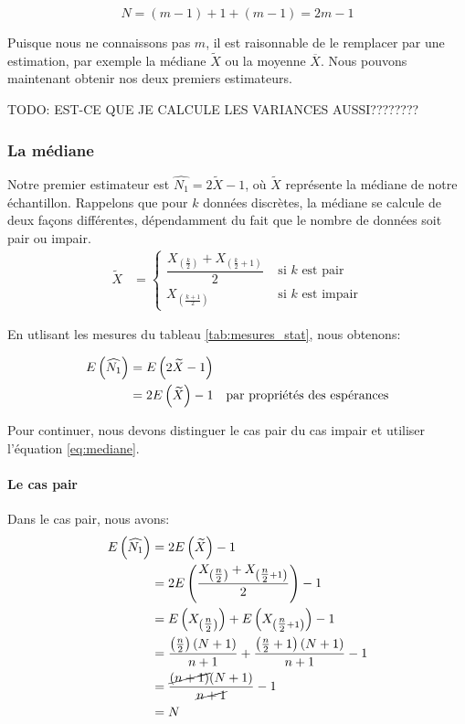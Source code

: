 \documentclass[10pt]{article}
\begin{document}
\[N=(m-1)+1+(m-1)=2m-1\]

Puisque nous ne connaissons pas \(m\), il est raisonnable de le
remplacer par une estimation, par exemple la médiane \(\widetilde{X}\)
ou la moyenne \(\overline{X}\). Nous pouvons maintenant obtenir nos deux
premiers estimateurs.

TODO: EST-CE QUE JE CALCULE LES VARIANCES AUSSI????????

\hypertarget{la-mediane}{%
\subsubsection{La médiane}\label{la-mediane}}

Notre premier estimateur est \(\widehat{N_1}=2\widetilde{X}-1\), où
\(\widetilde{X}\) représente la médiane de notre échantillon. Rappelons
que pour \(k\) données discrètes, la médiane se calcule de deux façons
différentes, dépendamment du fait que le nombre de données soit pair ou
impair. \begin{align}
\widetilde{X} &= 
\begin{cases}
\dfrac{X_{\left(\tfrac{k}{2}\right)}+X_{\left(\tfrac{k}{2}+1\right)}}{2} & \text{ si $k$ est pair} \\
X_{\left(\tfrac{k+1}{2}\right)} & \text{ si $k$ est impair}
\end{cases}
\label{eq:mediane}
\end{align}

En utlisant les mesures du tableau \ref{tab:mesures_stat}, nous
obtenons:

\begin{align*}
E\left(\widehat{N_1}\right) &= E\left(2\widetilde{X}-1\right) \\
&= 2E\left(\widetilde{X}\right)-1 \quad \text{par propriétés des espérances}
\end{align*}

Pour continuer, nous devons distinguer le cas pair du cas impair et
utiliser l'équation \ref{eq:mediane}.

\hypertarget{le-cas-pair}{%
\paragraph{Le cas pair}\label{le-cas-pair}}

Dans le cas pair, nous avons: \begin{align*}
E\left(\widehat{N_1}\right) &= 2E\left(\widetilde{X}\right)-1 \\
&= 2E\left(\dfrac{X_{\left(\tfrac{n}{2}\right)}+X_{\left(\tfrac{n}{2}+1\right)}}{2}\right)-1 \\
&= E\left(X_{\left(\tfrac{n}{2}\right)}\right)+E\left(X_{\left(\tfrac{n}{2}+1\right)}\right)-1 \\
&= \dfrac{\left(\tfrac{n}{2}\right)(N+1)}{n+1}+\dfrac{\left(\tfrac{n}{2}+1\right)(N+1)}{n+1}-1 \\
&= \dfrac{\cancel{(n+1)}(N+1)}{\cancel{n+1}}-1 \\
&= N
\end{align*}
\end{document}
